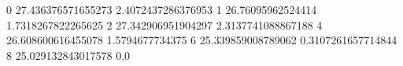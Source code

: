 0 27.436376571655273 2.4072437286376953
1 26.76095962524414 1.7318267822265625
2 27.342906951904297 2.3137741088867188
4 26.608600616455078 1.5794677734375
6 25.339859008789062 0.3107261657714844
8 25.029132843017578 0.0
